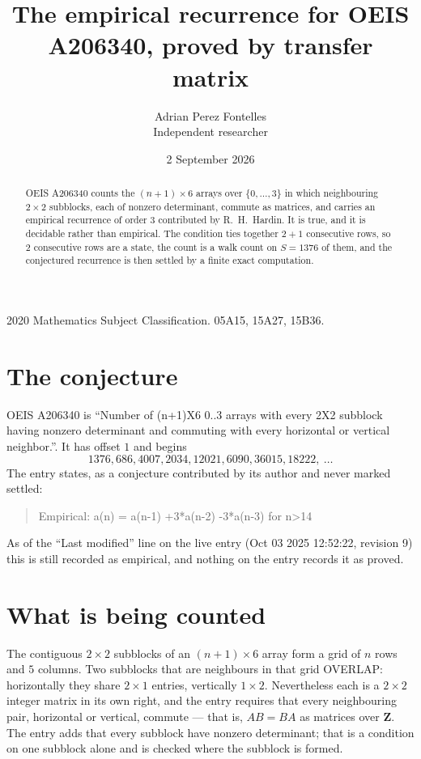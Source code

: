 \documentclass[11pt,a4paper]{article}
\title{The empirical recurrence for OEIS A206340, proved by transfer matrix}
\author{Adrian Perez Fontelles\\ \small Independent researcher}
\date{2 September 2026}
\theoremstyle{plain}
\theoremstyle{definition}
\begin{document}
\maketitle

\begin{abstract}
OEIS A206340 counts the $(n+1)\times6$ arrays over $\{0,\dots,3\}$ in which
neighbouring $2\times2$ subblocks, each of nonzero determinant, commute as matrices, and carries an empirical
recurrence
of order $3$ contributed by R.~H.~Hardin. It is true, and it is decidable rather than
empirical. The condition ties together $2+1$ consecutive rows, so $2$ consecutive rows are
a state, the count is a walk count on $S=1376$ of them, and the conjectured recurrence is then
settled by a finite exact computation.
\end{abstract}

\noindent\small 2020 Mathematics Subject Classification. 05A15, 15A27, 15B36.\normalsize

\section{The conjecture}

OEIS A206340 is ``Number of (n+1)X6 0..3 arrays with every 2X2 subblock having nonzero determinant and commuting with every horizontal or vertical neighbor.''. It has offset $1$ and begins
\[
1376, 686, 4007, 2034, 12021, 6090, 36015, 18222,\ \dots
\]
The entry states, as a conjecture contributed by its author and never marked settled:
\begin{quote}
Empirical: a(n) = a(n-1) +3*a(n-2) -3*a(n-3) for n>14
\end{quote}
As of the ``Last modified'' line on the live entry (Oct 03 2025 12:52:22, revision 9) this is still
recorded as empirical, and nothing on the entry records it as proved.

\section{What is being counted}

The contiguous $2\times2$ subblocks of an $(n+1)\times6$ array form a grid of $n$
rows and $5$ columns. Two subblocks that are neighbours in that
grid OVERLAP: horizontally they share $2\times1$ entries, vertically
$1\times2$. Nevertheless each is a $2\times2$ integer matrix in its own right, and
the entry requires that every neighbouring pair, horizontal or vertical, commute --- that is,
$AB=BA$ as matrices over $\mathbf{Z}$. The entry adds that every subblock have nonzero determinant; that is a condition on one subblock alone and is checked where the subblock is formed.
\end{document}
